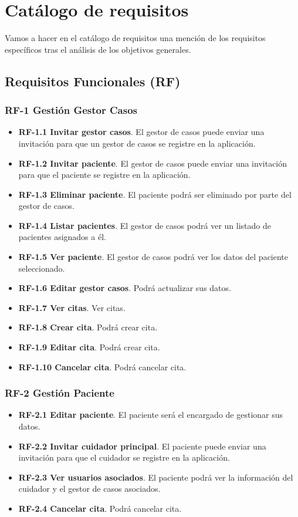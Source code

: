 \section{Catálogo de requisitos}
Vamos a hacer en el catálogo de requisitos una mención de los requisitos específicos tras el análisis de los objetivos generales.

\subsection{Requisitos Funcionales (RF)}
\subsubsection{RF-1 Gestión Gestor Casos}
\begin{itemize}
\tightlist 
\item \textbf{RF-1.1 Invitar gestor casos}. El gestor de casos puede enviar una invitación para que un gestor de casos se registre en la aplicación.
\item \textbf{RF-1.2 Invitar paciente}. El gestor de casos puede enviar una invitación para que el paciente se registre en la aplicación.
\item \textbf{RF-1.3 Eliminar paciente}. El paciente podrá ser eliminado por parte del gestor de casos.
\item \textbf{RF-1.4 Listar pacientes}. El gestor de casos podrá ver un listado de pacientes asignados a él.
\item \textbf{RF-1.5 Ver paciente}. El gestor de casos podrá ver los datos del paciente seleccionado.
\item \textbf{RF-1.6 Editar gestor casos}. Podrá actualizar sus datos.
\item \textbf{RF-1.7 Ver citas}. Ver citas.
\item \textbf{RF-1.8 Crear cita}. Podrá crear cita.
\item \textbf{RF-1.9 Editar cita}. Podrá crear cita.
\item \textbf{RF-1.10 Cancelar cita}. Podrá cancelar cita.
\end{itemize}

\subsubsection{RF-2 Gestión Paciente}
\begin{itemize}
\tightlist 
\item \textbf{RF-2.1 Editar paciente}. El paciente será el encargado de gestionar sus datos.
\item \textbf{RF-2.2 Invitar cuidador principal}. El paciente puede enviar una invitación para que el cuidador se registre en la aplicación.
\item \textbf{RF-2.3 Ver usuarios asociados}. El paciente podrá ver la información del cuidador y el gestor de casos asociados.
\item \textbf{RF-2.4 Cancelar cita}. Podrá cancelar cita.
\end{itemize}


